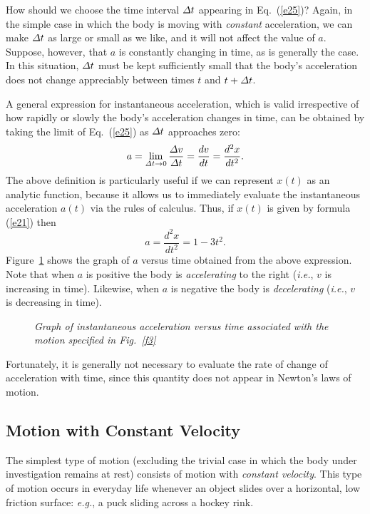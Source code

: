 How   should we choose the
time interval ${\mit\Delta} t$ appearing in Eq.~(\ref{e25})? Again, in the
simple case in which  the
body is moving with {\em constant} acceleration,  we can make ${\mit\Delta} t$ as
large or small as we like, and it will not affect the value of $a$. Suppose, however,
that $a$ is constantly changing in time, as is generally the case. 
In this situation, ${\mit\Delta} t$ must be kept sufficiently small that the body's acceleration
does not change appreciably between times $t$ and $t+{\mit\Delta} t$. 

A general  expression for instantaneous acceleration,  which
is valid irrespective of how rapidly or slowly the body's acceleration changes in time, 
can be obtained by taking the limit of Eq.~(\ref{e25}) as ${\mit\Delta} t$ approaches
zero:
\begin{equation}\label{e26}
a = \lim_{{\mit\Delta}t\rightarrow 0}\frac{{\mit\Delta}v}{{\mit\Delta} t}=
\frac{dv}{dt}=\frac{d^2 x}{dt^2}.
\end{equation}
  The above definition is particularly useful if we can represent $x(t)$ as an
analytic function, because it allows us to immediately evaluate the instantaneous acceleration
$a(t)$  via the rules of calculus. Thus, if $x(t)$ is given by formula (\ref{e21})
then
\begin{equation}
a = \frac{d^2 x}{dt^2} = 1 - 3 t^2.
\end{equation}
Figure~\ref{f5} shows the graph of $a$ versus time obtained from the above expression.
Note that when $a$ is positive  the body is {\em accelerating} to the right  ({\em i.e.}, $v$ is
increasing in time). Likewise, when $a$ is negative  the body is {\em decelerating}
  ({\em i.e.}, $v$ is
decreasing  in time). 

\begin{figure}[t]
\epsfysize=3in
\centerline{}
\caption{\em Graph of instantaneous acceleration versus time associated with the  motion
specified in Fig.~\ref{f3}}\label{f5}   
\end{figure}

Fortunately, it is generally not necessary to evaluate the rate of change of acceleration with time,
since this quantity does not appear in Newton's laws of motion.

\subsection{Motion with Constant Velocity}
The simplest type of motion (excluding the trivial case in which the body under
investigation remains at rest) consists of motion with {\em constant velocity}.
This type of motion occurs in everyday life whenever an object slides over a horizontal,
low friction surface: {\em e.g.}, a puck sliding across a hockey rink.
 
